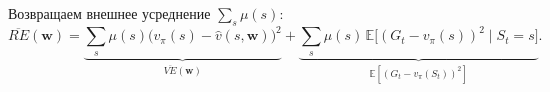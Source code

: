 \begin{solution}
    Возвращаем внешнее усреднение $\sum_s\mu(s)$:
    \begin{equation*}
        \overline{RE}(\mathbf w)
        = \underbrace{\sum_s \mu(s)\big(v_\pi(s) - \hat v(s,\mathbf w)\big)^2}_{\overline{VE}(\mathbf w)}
        + \underbrace{\sum_s \mu(s)\,\mathbb E\big[(G_t - v_\pi(s))^2\mid S_t=s\big]}_{\mathbb E[(G_t - v_\pi(S_t))^2]}.
    \end{equation*}
\end{solution}
